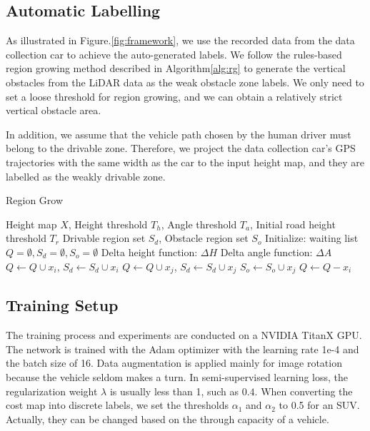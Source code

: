 \documentclass[letterpaper, 10 pt, conference]{ieeeconf}  %
\begin{document}
\subsection{Automatic Labelling}	\label{sec:autolabel}

As illustrated in Figure.\ref{fig:framework}, we use the recorded data from the data collection car to achieve the auto-generated labels.
We follow the rules-based region growing method described in Algorithm\ref{alg:rg} to generate the vertical obstacles from the LiDAR data as the weak obstacle zone labels. We only need to set a loose threshold for region growing, and we can obtain a relatively strict vertical obstacle area.

In addition, we assume that the vehicle path chosen by the human driver must belong to the drivable zone. Therefore, we project the data collection car's GPS trajectories with the same width as the car to the input height map, and they are labelled as the weakly drivable zone.

\begin{algorithm}	
	\caption{Region Grow}
	\label{alg:rg}
	\begin{algorithmic}[1]
		\Require Height map $X$, Height threshold $T_h$, Angle threshold $T_a$, Initial road height threshold $T_r$
		\Ensure Drivable region set $S_d$, Obstacle region set $S_o$
		\State Initialize: waiting list $Q=\emptyset,S_d=\emptyset,S_o=\emptyset$
		\State Delta height function: $\Delta H$
		\State Delta angle function: $\Delta A$
		\State $Q \gets Q \cup x_i$, $S_d \gets S_d \cup x_i$
		\EndIf
		\EndFor
		\State $Q \gets Q \cup x_j$, $S_d \gets S_d \cup x_j$
		\Else
		\State $S_o \gets S_o \cup x_j$
		\EndIf
		\EndFor
		\State $Q \gets Q-x_i$
		\EndWhile
	\end{algorithmic}
\end{algorithm}

\subsection{Training Setup}
The training process and experiments are conducted on a NVIDIA TitanX GPU. The network is trained with the Adam optimizer with the learning rate 1e-4 and the batch size of 16. Data augmentation is applied mainly for image rotation because the vehicle seldom makes a turn. In semi-supervised learning loss, the regularization weight $\lambda$ is usually less than 1, such as $0.4$. When converting the cost map into discrete labels, we set the thresholds $\alpha_1$ and $\alpha_2$ to 0.5 for an SUV. Actually, they can be changed based on the through capacity of a vehicle. 
\end{document}
